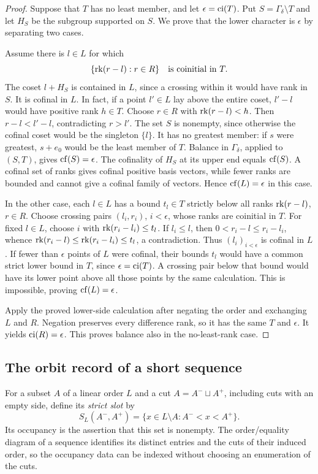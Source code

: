 \begin{proof}
Suppose that $T$ has no least member, and let
$\epsilon=\operatorname{ci}(T)$. Put $S=\Gamma_\delta\setminus T$ and let
$H_S$ be the subgroup supported on $S$. We prove that the lower
character is $\epsilon$ by separating two cases.

Assume there is $l\in L$ for which
\[
\{\operatorname{rk}(r-l):r\in R\}
\quad\text{is coinitial in }T.
\]
The coset $l+H_S$ is contained in $L$, since a crossing within it
would have rank in $S$. It is cofinal in $L$. In fact, if a point
$l'\in L$ lay above the entire coset, $l'-l$ would have positive
rank $h\in T$. Choose $r\in R$ with $\operatorname{rk}(r-l)<h$. Then
$r-l<l'-l$, contradicting $r>l'$. The set $S$ is nonempty, since
otherwise the cofinal coset would be the singleton $\{l\}$.
It has no greatest member: if $s$ were greatest, $s+e_0$ would
be the least member of $T$. Balance in $\Gamma_\delta$, applied
to $(S,T)$, gives $\operatorname{cf}(S)=\epsilon$. The cofinality of $H_S$ at
its upper end equals $\operatorname{cf}(S)$. A cofinal set of ranks gives
cofinal positive basis vectors, while fewer ranks are bounded
and cannot give a cofinal family of vectors. Hence
$\operatorname{cf}(L)=\epsilon$ in this case.

In the other case, each $l\in L$ has a bound $t_l\in T$ strictly
below all ranks $\operatorname{rk}(r-l)$, $r\in R$. Choose crossing pairs
$(l_i,r_i)$, $i<\epsilon$, whose ranks are coinitial in $T$.
For fixed $l\in L$, choose $i$ with
$\operatorname{rk}(r_i-l_i)\leq t_l$. If $l_i\leq l$, then
$0<r_i-l\leq r_i-l_i$, whence
$\operatorname{rk}(r_i-l)\leq\operatorname{rk}(r_i-l_i)\leq t_l$, a contradiction.
Thus $(l_i)_{i<\epsilon}$ is cofinal in $L$.
If fewer than $\epsilon$ points of $L$ were cofinal, their bounds
$t_l$ would have a common strict lower bound in $T$, since
$\epsilon=\operatorname{ci}(T)$. A crossing pair below that bound would have
its lower point above all those points by the same calculation.
This is impossible, proving $\operatorname{cf}(L)=\epsilon$.

Apply the proved lower-side calculation after negating the order
and exchanging $L$ and $R$. Negation preserves every difference
rank, so it has the same $T$ and $\epsilon$. It yields
$\operatorname{ci}(R)=\epsilon$. This proves balance also in the no-least-rank
case.
\end{proof}

\subsection{The orbit record of a short sequence}

For a subset $A$ of a linear order $L$ and a cut
$A=A^-\sqcup A^+$, including cuts with an empty side, define its
\emph{strict slot} by
\[
S_L(A^-,A^+)=\{x\in L\setminus A:A^-<x<A^+\}.
\]
Its occupancy is the assertion that this set is nonempty.
The order/equality diagram of a sequence identifies its distinct
entries and the cuts of their induced order, so the occupancy
data can be indexed without choosing an enumeration of the cuts.

